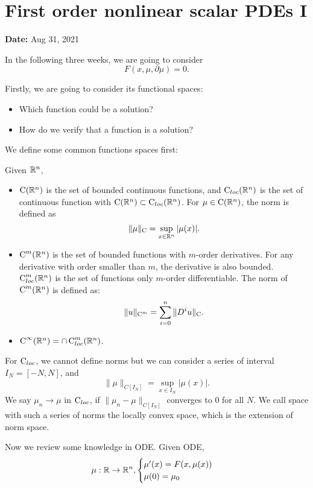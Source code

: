 \newpage 
\section{First order nonlinear scalar PDEs I}
\textbf{Date:} Aug 31, 2021

In the following three weeks, we are going to consider 
\[
    F(x, \mu, \partial \mu) = 0.    
\]

Firstly, we are going to consider its functional spaces:
\begin{itemize}
    \item Which function could be a solution?
    \item How do we verify that a function is a solution?
\end{itemize}

We define some common functions spaces first:

\begin{definition}
 Given $\mathbb{R}^n$,
\begin{itemize}
    \item $\operatorname{C}(\mathbb{R}^n)$ is the set of bounded continuous functions, and $\operatorname{C}_{loc}(\mathbb{R}^n)$ is the set of continuous function with $\operatorname{C}(\mathbb{R}^n) \subset \operatorname{C}_{loc}(\mathbb{R}^n)$. For $\mu\in \operatorname{C}(\mathbb{R}^n)$, the norm is defined as
    \[
            \|\mu\|_{\operatorname{C}} = \sup_{x\in \mathbb{R}^n} |\mu(x)|. 
    \]
    \item $\operatorname{C}^m(\mathbb{R}^n)$ is the set of bounded functions with $m$-order derivatives. For any derivative with order smaller than $m$, the derivative is also bounded.  $\operatorname{C}^m_{loc}(\mathbb{R}^n)$ is the set of functions only $m$-order differentiable. The norm of $\operatorname{C}^m(\mathbb{R}^n)$ is defined as:
    \[
        \|u\|_{\operatorname{C}^m} = \sum_{i=0}^n \|D^i u\|_{\operatorname{C}}.    
    \]
    \item $\operatorname{C}^\infty(\mathbb{R}^n) = \cap \operatorname{C}_{loc}^m (\mathbb{R}^n)$.
\end{itemize}
\end{definition}
For $\operatorname{C}_{loc}$, we cannot define norms but we can consider a series of interval $I_N= [-N, N]$, and 
\[
    \|\mu\|_{C[I_N]} = \sup_{x\in I_N} |\mu(x)|.    
\]
We say $\mu_n \to \mu$ in $\operatorname{C}_{loc}$, if $\|\mu_n -\mu\|_{C[I_N]}$ converges to $0$ for all $N$. We call space with such a series of norms the locally convex space, which is the extension of norm space.

Now we review some knowledge in ODE. Given ODE,
\[
\mu : \mathbb{R} \to \mathbb{R}^n, \begin{cases}
    \mu'(x) = F(x, \mu(x))\\
    \mu(0) = \mu_0
\end{cases}    
\]

